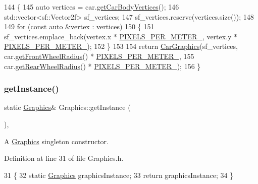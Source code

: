 \begin{DoxyCode}
144                                                      \{
145     \textcolor{keyword}{auto} vertices = car.\hyperlink{classCar_a54179bc7ddca42a4f285c0475174f5b5}{getCarBodyVertices}();
146     std::vector<sf::Vector2f> sf\_vertices;
147     sf\_vertices.reserve(vertices.size());
148 
149     \textcolor{keywordflow}{for} (\textcolor{keyword}{const} \textcolor{keyword}{auto} &vertex : vertices)
150     \{
151         sf\_vertices.emplace\_back(vertex.x * \hyperlink{classGraphics_af9c6251065c2900d0a92380c2bea26b2}{PIXELS\_PER\_METER\_}, vertex.y * 
      \hyperlink{classGraphics_af9c6251065c2900d0a92380c2bea26b2}{PIXELS\_PER\_METER\_});
152     \}
153 
154     \textcolor{keywordflow}{return} \hyperlink{classCarGraphics}{CarGraphics}(sf\_vertices, car.\hyperlink{classCar_a00f0b724a34f1f98411e098492823bf1}{getFrontWheelRadius}() * 
      \hyperlink{classGraphics_af9c6251065c2900d0a92380c2bea26b2}{PIXELS\_PER\_METER\_},
155                        car.\hyperlink{classCar_aeb0e2313eb141c7977f3c1a9a2737933}{getRearWheelRadius}() * 
      \hyperlink{classGraphics_af9c6251065c2900d0a92380c2bea26b2}{PIXELS\_PER\_METER\_});
156 \}
\end{DoxyCode}
\mbox{\label{classGraphics_a115d78c8686f6c82add227bf1fe2c81c}} 
\subsubsection{\texorpdfstring{get\+Instance()}{getInstance()}}
{\footnotesize\ttfamily static \hyperlink{classGraphics}{Graphics}\& Graphics\+::get\+Instance (\begin{DoxyParamCaption}{ }\end{DoxyParamCaption})\hspace{0.3cm}{\ttfamily [inline]}, {\ttfamily [static]}}



A \hyperlink{classGraphics}{Graphics} singleton constructor. 



Definition at line 31 of file Graphics.\+h.


\begin{DoxyCode}
31                                    \{
32         \textcolor{keyword}{static} \hyperlink{classGraphics}{Graphics} graphicsInstance;
33         \textcolor{keywordflow}{return} graphicsInstance;
34     \}
\end{DoxyCode}
\mbox{\label{classGraphics_abad4212fb355b9b3d6504ad019832213}} 
